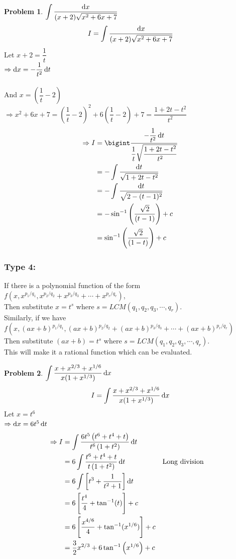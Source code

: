 \documentclass[14]{article}
\theoremstyle{definition}
\newtheorem{prob}{Problem}
\theoremstyle{case}
\begin{document}
\begin{prob}
$\displaystyle \int \dfrac{\dif x}{(x+2)\sqrt{x^2 + 6x + 7}}$
\[I = \int \dfrac{\dif x}{(x+2)\sqrt{x^2 + 6x + 7}}\]
Let $x + 2 = \dfrac1t$\\
$\Rightarrow \dif x = - \dfrac1{t^2} \dif t$\\\\
And $x = \left(\dfrac1t - 2\right)$\\
$\Rightarrow x^2 + 6x + 7 = \left(\dfrac1t - 2\right)^2 + 6\left(\dfrac1t - 2\right) + 7 = \dfrac{1 + 2t - t^2}{t^2}$
\begin{align*}
\Rightarrow I &= \bigint \dfrac{- \dfrac1{t^2} \dif t}{\dfrac1t \sqrt{\dfrac{1 + 2t - t^2}{t^2}}}\\
&= -\int \dfrac{\dif t}{\sqrt{1 + 2t - t^2}}\\
&= - \int\dfrac{\dif t}{\sqrt{2-(t-1)^2}}\\
&= - \sin^{-1}\left(\dfrac{\sqrt2}{(t-1)}\right) + c\\
&= \sin^{-1}\left(\dfrac{\sqrt2}{(1-t)}\right) + c
\end{align*}
\end{prob}
\pagebreak
\subsubsection{Type 4:}
If there is a polynomial function of the form\\
$f\left(x, x^{p_1/q_1}, x^{p_2/q_2} + x^{p_3/q_3} + \cdots + x^{p_r/q_r}\right)$,\\
Then substitute $x = t^s$ where $s = LCM\left( q_1, q_2, q_3, \cdots, q_r\right)$.\\
Similarly, if we have\\
$f\left(x, (ax+b)^{p_1/q_1}, (ax+b)^{p_2/q_2} + (ax+b)^{p_3/q_3} + \cdots + (ax+b)^{p_r/q_r}\right)$\\
Then substitute $(ax+b) = t^s$ where $s = LCM\left( q_1, q_2, q_3, \cdots, q_r\right)$.\\
This will make it a rational function which can be evaluated.
\begin{prob}
$\displaystyle \int \dfrac{x + x^{2/3} + x^{1/6}}{x (1 + x^{1/3})} \dif x$
\[I = \int \dfrac{x + x^{2/3} + x^{1/6}}{x (1 + x^{1/3})} \dif x\]
Let $x = t^6$\\
$\Rightarrow \dif x = 6t^5 \dif t$
\begin{align*}
\Rightarrow I &= \int\dfrac{6t^5 \left( t^6 + t^4 + t \right)}{t^6 \left( 1 + t^2 \right)} \dif t\\
&= 6 \int \dfrac{t^6 + t^4 + t}{t\left( 1 + t^2 \right)} \dif t && \text{Long division}\\
&= 6 \int \left[ t^3 + \dfrac1{t^2 + 1} \right] \dif t\\
&= 6 \left[ \dfrac{t^4}{4} + \tan^{-1}(t) \right] + c\\
&= 6 \left[ \dfrac{x^{4/6}}{4} + \tan^{-1}(x^{1/6}) \right] + c\\
&= \dfrac32 x^{2/3} + 6 \tan^{-1}\left( x^{1/6} \right) + c\\
\end{align*}
\end{prob}
\end{document}
